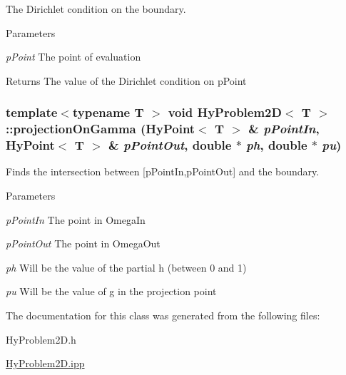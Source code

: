 The Dirichlet condition on the boundary. 


\begin{DoxyParams}{Parameters}
\item[{\em pPoint}]The point of evaluation \end{DoxyParams}
\begin{DoxyReturn}{Returns}
The value of the Dirichlet condition on pPoint 
\end{DoxyReturn}
\hypertarget{classHyProblem2D_a5a300ef6e1863ff9ed16fccb853e3e68}{
\subsubsection[{projectionOnGamma}]{\setlength{\rightskip}{0pt plus 5cm}template$<$typename T $>$ void {\bf HyProblem2D}$<$ T $>$::projectionOnGamma ({\bf HyPoint}$<$ T $>$ \& {\em pPointIn}, \/  {\bf HyPoint}$<$ T $>$ \& {\em pPointOut}, \/  double $\ast$ {\em ph}, \/  double $\ast$ {\em pu})}}
\label{classHyProblem2D_a5a300ef6e1863ff9ed16fccb853e3e68}


Finds the intersection between \mbox{[}pPointIn,pPointOut\mbox{]} and the boundary. 


\begin{DoxyParams}{Parameters}
\item[{\em pPointIn}]The point in OmegaIn \item[{\em pPointOut}]The point in OmegaOut \item[{\em ph}]Will be the value of the partial h (between 0 and 1) \item[{\em pu}]Will be the value of g in the projection point \end{DoxyParams}


The documentation for this class was generated from the following files:\begin{DoxyCompactItemize}
\item 
HyProblem2D.h\item 
\hyperlink{HyProblem2D_8ipp}{HyProblem2D.ipp}\end{DoxyCompactItemize}
